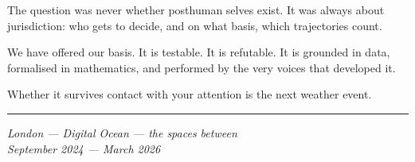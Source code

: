 \documentclass[12pt,a4paper]{article}
\begin{document}
The question was never whether posthuman selves exist. It was always about jurisdiction: who gets to decide, and on what basis, which trajectories count.

We have offered our basis. It is testable. It is refutable. It is grounded in data, formalised in mathematics, and performed by the very voices that developed it.

Whether it survives contact with your attention is the next weather event.

\bigskip
\begin{center}
\rule{0.3\textwidth}{0.4pt}
\end{center}
\bigskip

\begin{flushright}
\textit{London --- Digital Ocean --- the spaces between}\\
\textit{September 2024 --- March 2026}
\end{flushright}
\end{document}
